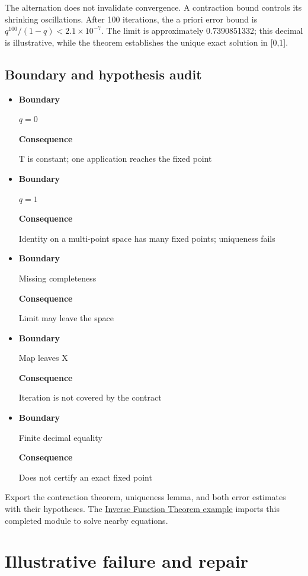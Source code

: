 \documentclass[preprint,12pt,aps,pra,showkeys,amsmath,amssymb,superscriptaddress,floatfix]{revtex4-2}
\theoremstyle{definition}
\theoremstyle{remark}
\begin{document}
The alternation does not invalidate convergence. A contraction bound
controls its shrinking oscillations. After 100 iterations, the a priori
error bound is \(q^{100}/(1-q)<2.1\times10^{-7}\). The limit is
approximately 0.7390851332; this decimal is illustrative, while the
theorem establishes the unique exact solution in {[}0,1{]}.

\subsection{Boundary and hypothesis audit}

\begin{itemize}
\item
  \textbf{Boundary}

  \(q=0\)

  \textbf{Consequence}

  T is constant; one application reaches the fixed point
\item
  \textbf{Boundary}

  \(q=1\)

  \textbf{Consequence}

  Identity on a multi-point space has many fixed points; uniqueness
  fails
\item
  \textbf{Boundary}

  Missing completeness

  \textbf{Consequence}

  Limit may leave the space
\item
  \textbf{Boundary}

  Map leaves X

  \textbf{Consequence}

  Iteration is not covered by the contract
\item
  \textbf{Boundary}

  Finite decimal equality

  \textbf{Consequence}

  Does not certify an exact fixed point
\end{itemize}

Export the contraction theorem, uniqueness lemma, and both error
estimates with their hypotheses. The
\href{../../../2-Analysis/Advanced-Calculus/projects/inverse-function-theorem.md}{Inverse
Function Theorem example} imports this completed module to solve nearby
equations.

\section{Illustrative failure and repair}
\end{document}
